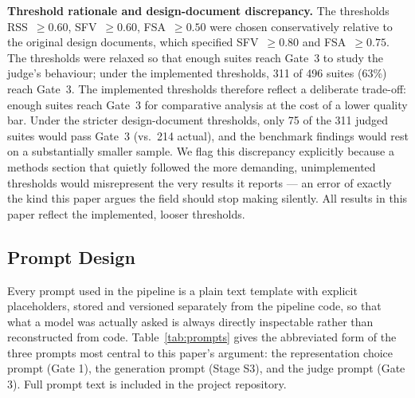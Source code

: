 \documentclass[conference]{IEEEtran}
\begin{document}
  \textbf{Threshold rationale and design-document discrepancy.}
  The thresholds RSS~$\geq 0.60$, SFV~$\geq 0.60$, FSA~$\geq 0.50$ were
  chosen conservatively relative to the original design documents, which
  specified SFV~$\geq 0.80$ and FSA~$\geq 0.75$. The thresholds were relaxed
  so that enough suites reach Gate~3 to study the judge's behaviour; under the
  implemented thresholds, 311 of 496 suites (63\%) reach Gate~3. The implemented thresholds therefore
  reflect a deliberate trade-off: enough suites reach Gate~3 for comparative
  analysis at the cost of a lower quality bar. Under the stricter
  design-document thresholds, only 75 of the 311 judged suites would pass
  Gate~3 (vs.\ 214 actual), and the benchmark findings would
  rest on a substantially smaller sample. We flag this discrepancy explicitly
  because a methods section that quietly followed the more demanding,
  unimplemented thresholds would misrepresent the very results it reports —
  an error of exactly the kind this paper argues the field should stop making
  silently. All results in this paper reflect the implemented, looser
  thresholds.

  \subsection{Prompt Design}
  \label{sec:prompts}
  Every prompt used in the pipeline is a plain text template with explicit
  placeholders, stored and versioned separately from the pipeline code, so that
  what a model was actually asked is always directly inspectable rather than
  reconstructed from code. Table~\ref{tab:prompts} gives the abbreviated form of
  the three prompts most central to this paper's argument: the representation
  choice prompt (Gate 1), the generation prompt (Stage S3), and the judge
  prompt (Gate 3). Full prompt text is included in the project repository.
\end{document}
